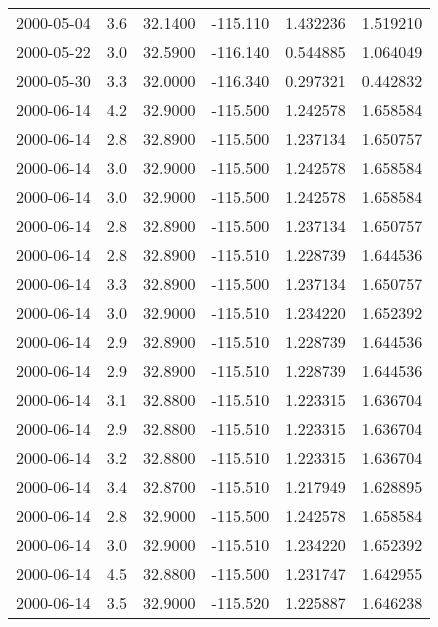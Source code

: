 \begin{tabular}{lrrrrr}
2000-05-04 &       3.6 &  32.1400 &  -115.110 &         1.432236 &         1.519210 \\
2000-05-22 &       3.0 &  32.5900 &  -116.140 &         0.544885 &         1.064049 \\
2000-05-30 &       3.3 &  32.0000 &  -116.340 &         0.297321 &         0.442832 \\
2000-06-14 &       4.2 &  32.9000 &  -115.500 &         1.242578 &         1.658584 \\
2000-06-14 &       2.8 &  32.8900 &  -115.500 &         1.237134 &         1.650757 \\
2000-06-14 &       3.0 &  32.9000 &  -115.500 &         1.242578 &         1.658584 \\
2000-06-14 &       3.0 &  32.9000 &  -115.500 &         1.242578 &         1.658584 \\
2000-06-14 &       2.8 &  32.8900 &  -115.500 &         1.237134 &         1.650757 \\
2000-06-14 &       2.8 &  32.8900 &  -115.510 &         1.228739 &         1.644536 \\
2000-06-14 &       3.3 &  32.8900 &  -115.500 &         1.237134 &         1.650757 \\
2000-06-14 &       3.0 &  32.9000 &  -115.510 &         1.234220 &         1.652392 \\
2000-06-14 &       2.9 &  32.8900 &  -115.510 &         1.228739 &         1.644536 \\
2000-06-14 &       2.9 &  32.8900 &  -115.510 &         1.228739 &         1.644536 \\
2000-06-14 &       3.1 &  32.8800 &  -115.510 &         1.223315 &         1.636704 \\
2000-06-14 &       2.9 &  32.8800 &  -115.510 &         1.223315 &         1.636704 \\
2000-06-14 &       3.2 &  32.8800 &  -115.510 &         1.223315 &         1.636704 \\
2000-06-14 &       3.4 &  32.8700 &  -115.510 &         1.217949 &         1.628895 \\
2000-06-14 &       2.8 &  32.9000 &  -115.500 &         1.242578 &         1.658584 \\
2000-06-14 &       3.0 &  32.9000 &  -115.510 &         1.234220 &         1.652392 \\
2000-06-14 &       4.5 &  32.8800 &  -115.500 &         1.231747 &         1.642955 \\
2000-06-14 &       3.5 &  32.9000 &  -115.520 &         1.225887 &         1.646238 \\

\end{tabular}

